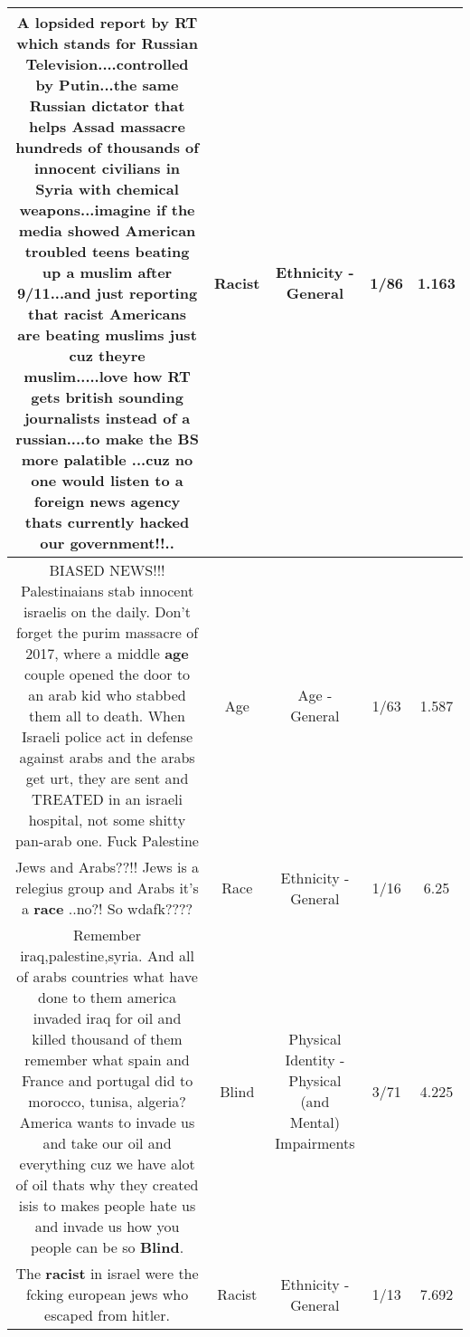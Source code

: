 \documentclass[11pt]{article}
\newlength\mylength
\begin{document}
\begin{center}
\begin{longtable}{|C{.65\mylength}|C{.30\mylength}|C{.12\mylength}|C{.12\mylength}|C{.12\mylength}|}
  \small A lopsided report by RT which stands for Russian Television....controlled by Putin...the same Russian dictator that helps Assad massacre hundreds of thousands of innocent civilians in Syria with chemical weapons...imagine if the media showed American troubled teens beating up a muslim after 9/11...and just reporting that \textbf{racist} Americans are beating muslims just cuz theyre muslim.....love how RT gets british sounding journalists instead of a russian....to make the BS more palatible ...cuz no one would listen to a foreign news agency thats currently hacked our government!!..\normalsize   & Racist & Ethnicity - General & 1/86 & 1.163 \\  \hline
  \small BIASED NEWS!!! Palestinaians stab innocent israelis on the daily. Don't forget the purim massacre of 2017, where a middle \textbf{age} couple opened the door to an arab kid who stabbed them all to death. When Israeli police act in defense against arabs and the arabs get urt, they are sent and TREATED in an israeli hospital, not some shitty pan-arab one. Fuck Palestine\normalsize   & Age & Age - General & 1/63 & 1.587 \\  \hline
  \small Jews and Arabs??!! Jews is a relegius group and Arabs it's a \textbf{race} ..no?! So wdafk????\normalsize   & Race & Ethnicity - General & 1/16 & 6.25 \\  \hline
  \small Remember iraq,palestine,syria. And all of arabs countries what have done to them america invaded iraq for oil and killed thousand of them remember what spain and France and portugal did to morocco, tunisa, algeria? America wants to invade us and take our oil and everything cuz we have alot of oil thats why they created isis to makes people hate us and invade us how you people can be so \textbf{Blind}.\normalsize   & Blind & Physical Identity - Physical (and Mental) Impairments & 3/71 & 4.225 \\  \hline
  \small The \textbf{racist} in israel were the fcking european jews who escaped from hitler.\normalsize   & Racist & Ethnicity - General & 1/13 & 7.692 \\  \hline

\end{longtable}
\end{center}
\end{document}
